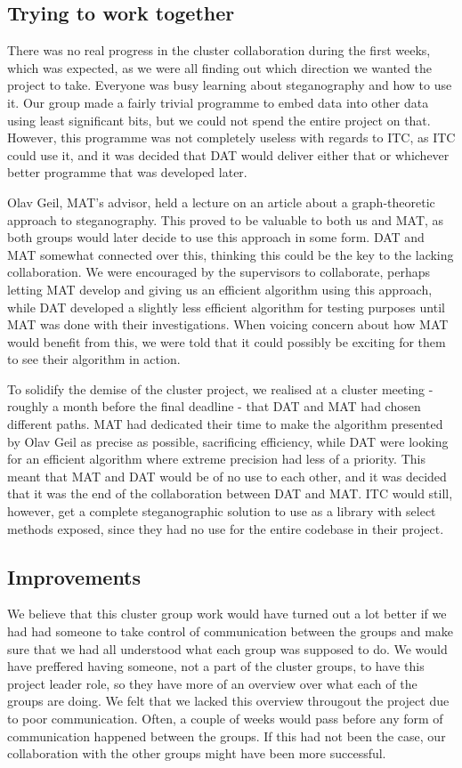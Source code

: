 \documentclass{article}
\begin{document}
\subsection*{Trying to work together}
There was no real progress in the cluster collaboration during the first weeks, which was expected, as we were all finding out which direction we wanted the project to take.
Everyone was busy learning about steganography and how to use it.
Our group made a fairly trivial programme to embed data into other data using least significant bits, but we could not spend the entire project on that. However, this programme was not completely useless with regards to ITC, as ITC could use it, and it was decided that DAT would deliver either that or whichever better programme that was developed later.

Olav Geil, MAT's advisor, held a lecture on an article about a graph-theoretic approach to steganography.
This proved to be valuable to both us and MAT, as both groups would later decide to use this approach in some form.
DAT and MAT somewhat connected over this, thinking this could be the key to the lacking collaboration.
We were encouraged by the supervisors to collaborate, perhaps letting MAT develop and giving us an efficient algorithm using this approach, while DAT developed a slightly less efficient algorithm for testing purposes until MAT was done with their investigations.
When voicing concern about how MAT would benefit from this, we were told that it could possibly be exciting for them to see their algorithm in action.

To solidify the demise of the cluster project, we realised at a cluster meeting - roughly a month before the final deadline - that DAT and MAT had chosen different paths.
MAT had dedicated their time to make the algorithm presented by Olav Geil as precise as possible, sacrificing efficiency, while DAT were looking for an efficient algorithm where extreme precision had less of a priority.
This meant that MAT and DAT would be of no use to each other, and it was decided that it was the end of the collaboration between DAT and MAT.
ITC would still, however, get a complete steganographic solution to use as a library with select methods exposed, since they had no use for the entire codebase in their project.

\subsection*{Improvements}
We believe that this cluster group work would have turned out a lot better if we had had someone to take control of communication between the groups and make sure that we had all understood what each group was supposed to do. 
We would have preffered having someone, not a part of the cluster groups, to have this project leader role, so they have more of an overview over what each of the groups are doing. We felt that we lacked this overview througout the project due to poor communication.
Often, a couple of weeks would pass before any form of communication happened between the groups. 
If this had not been the case, our collaboration with the other groups might have been more successful. 
\end{document}

